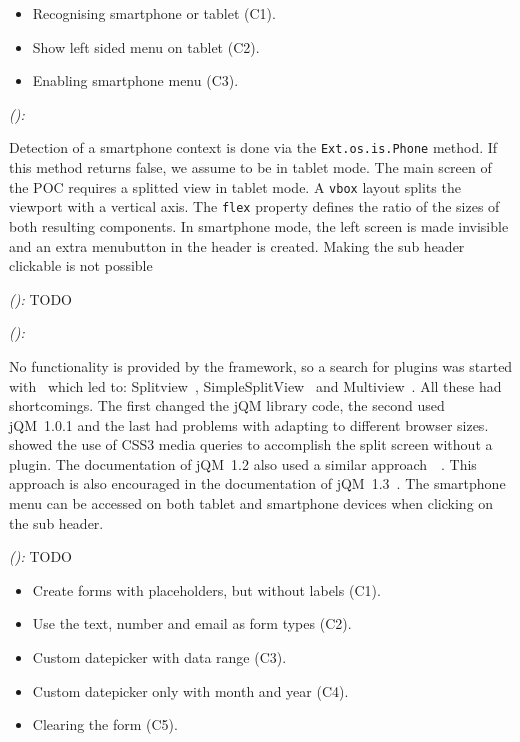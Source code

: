\documentclass[a4paper]{artikel3}
\newcommand{\code}[1]{\texttt{#1}}
\newcommand{\framework}[2]{ \emph{#1 (\textbf{#2}): }} %
\begin{document}
\begin{itemize}
  \item Recognising smartphone or tablet (C1).
  \item Show left sided menu on tablet (C2).
  \item Enabling smartphone menu (C3).
\end{itemize}

\framework{\sta{}}{}

Detection of a smartphone context is done via the \code{Ext.os.is.Phone} method.  
If this method returns false,  we assume to be in tablet mode.    
The main screen of the POC requires a splitted view in tablet mode.  
A \code{vbox} layout splits the viewport with a vertical axis.  
The \code{flex} property defines the ratio of the sizes of both resulting components.  
In smartphone mode,  the left screen is made invisible and an extra menubutton in the header is created.  
Making the sub header clickable is not possible  

\framework{\kendoa{}}{}
TODO

\framework{\jqma{}}{}

No functionality is provided by the framework, so a search for plugins was started with~\cite{Deering2012} which led to: Splitview~\cite{Rahman2013}, SimpleSplitView~\cite{Yared2013} and Multiview~\cite{Franck2012}. 
All these had shortcomings. 
The first changed the jQM library code, the second used jQM~1.0.1 and the last had problems with adapting to different browser sizes.
\cite{Hadlock2012} showed the use of CSS3 media queries to accomplish the split screen without a plugin.
The documentation of jQM~1.2 also used a similar approach~~\cite{JQuery2012b}.
This approach is also encouraged in the documentation of jQM~1.3~\cite{JQuery2013e}.
The smartphone menu can be accessed on both tablet and smartphone devices when clicking on the sub header.

\framework{\lungoa{}}{}
TODO


\begin{itemize}
 \item Create forms with placeholders, but without labels (C1).
 \item Use the text, number and email as form types (C2).
 \item Custom datepicker with data range (C3).
 \item Custom datepicker only with month and year (C4).
 \item Clearing the form (C5).
\end{itemize}
\end{document}
